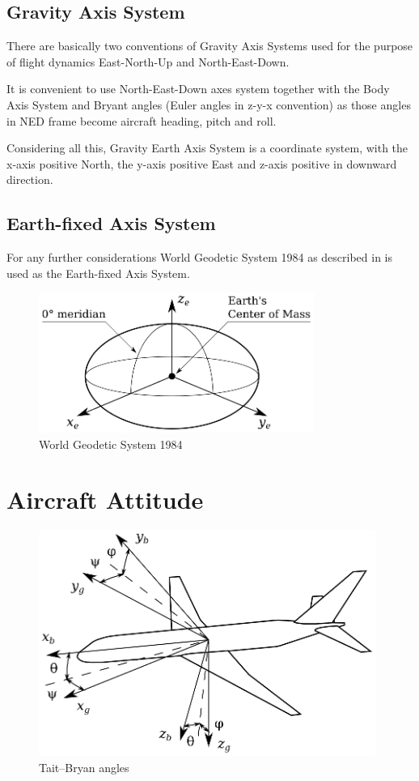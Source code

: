 \subsection{Gravity Axis System}

There are basically two conventions of Gravity Axis Systems used for the purpose of flight dynamics East\nobreakdash-North\nobreakdash-Up and North\nobreakdash-East\nobreakdash-Down.

It is convenient to use North-East-Down axes system together with the Body Axis System and Bryant angles (Euler angles in z\nobreakdash-y\nobreakdash-x convention) as those angles in NED frame become aircraft heading, pitch and roll.

Considering all this, Gravity Earth Axis System is a coordinate system, with the x\nobreakdash-axis positive North, the y\nobreakdash-axis positive East and z\nobreakdash-axis positive in downward direction.

\subsection{Earth-fixed Axis System}

For any further considerations World Geodetic System 1984 as described in \cite{NIMA-TR-8350-2} is used as the Earth-fixed Axis System.

\begin{figure}[h!]
  \centering
  \includegraphics[width=90mm]{eps/coordinate_system_WGS.eps}
  \caption{World Geodetic System 1984}
\end{figure}

\section{Aircraft Attitude}

\begin{figure}[h!]
  \centering
  \includegraphics[width=110mm]{eps/roll_pitch_yaw.eps}
  \caption{Tait–Bryan angles}
\end{figure}


